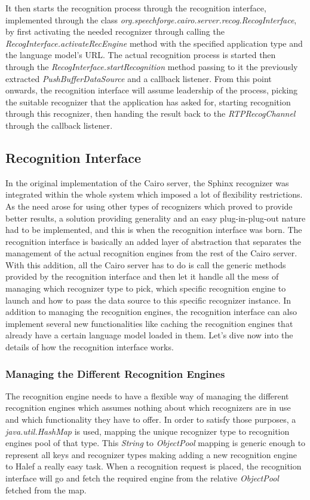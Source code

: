 It then starts the recognition process through the recognition interface, implemented through the class \textit{org.speechforge.cairo.server.recog.RecogInterface}, by first activating the needed recognizer through calling the \textit{RecogInterface.activateRecEngine} method with the specified application type and the language model's URL.
The actual recognition process is started then through the \textit{RecogInterface.startRecognition} method passing to it the previously extracted \textit{PushBufferDataSource} and a callback listener.
From this point onwards, the recognition interface will assume leadership of the process, picking the suitable recognizer that the application has asked for, starting recognition through this recognizer, then handing the result back to the \textit{RTPRecogChannel} through the callback listener.

\subsection{Recognition Interface}
In the original implementation of the Cairo server, the Sphinx recognizer was integrated within the whole system which imposed a lot of flexibility restrictions.
As the need arose for using other types of recognizers which proved to provide better results, a solution providing generality and an easy plug-in-plug-out nature had to be implemented, and this is when the recognition interface was born.
The recognition interface is basically an added layer of abstraction that separates the management of the actual recognition engines from the rest of the Cairo server.
With this addition, all the Cairo server has to do is call the generic methods provided by the recognition interface and then let it handle all the mess of managing which recognizer type to pick, which specific recognition engine to launch and how to pass the data source to this specific recognizer instance.
In addition to managing the recognition engines, the recognition interface can also implement several new functionalities like caching the recognition engines that already have a certain language model loaded in them.
Let's dive now into the details of how the recognition interface works.

\subsubsection{Managing the Different Recognition Engines}
The recognition engine needs to have a flexible way of managing the different recognition engines which assumes nothing about which recognizers are in use and which functionality they have to offer.
In order to satisfy those purposes, a \textit{java.util.HashMap} is used, mapping the unique recognizer type to recognition engines pool of that type.
This \textit{String} to \textit{ObjectPool} mapping is generic enough to represent all keys and recognizer types making adding a new recognition engine to Halef a really easy task.
When a recognition request is placed, the recognition interface will go and fetch the required engine from the relative \textit{ObjectPool} fetched from the map.

